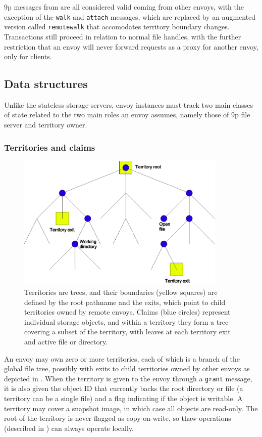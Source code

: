 9p messages from  are all considered valid coming from other envoys, with the exception of the \texttt{walk} and \texttt{attach} messages, which are replaced by an augmented version called \texttt{remotewalk} that accomodates territory boundary changes. Transactions still proceed in relation to normal file handles, with the further restriction that an envoy will never forward requests as a proxy for another envoy, only for clients.

\subsection{Data structures}

Unlike the stateless storage servers, envoy instances must track two main classes of state related to the two main roles an envoy assumes, namely those of 9p file server and territory owner.

\subsubsection{Territories and claims}

\begin{figure}[tp]
\centering
\includegraphics[width=100mm]{figures/territory-claims}
\caption[A territory managed by a single envoy]{Territories are trees, and their boundaries (yellow squares) are defined by the root pathname and the exits, which point to child territories owned by remote envoys. Claims (blue circles) represent individual storage objects, and within a territory they form a tree covering a subset of the territory, with leaves at each territory exit and active file or directory.}
\label{fig:territory-claims}
\end{figure}

An envoy may own zero or more territories, each of which is a branch of the global file tree, possibly with exits to child territories owned by other envoys as depicted in . When the territory is given to the envoy through a \texttt{grant} message, it is also given the object ID that currently backs the root directory or file (a territory can be a single file) and a flag indicating if the object is writable. A territory may cover a snapshot image, in which case all objects are read-only. The root of the territory is never flagged as copy-on-write, so thaw operations (described in ) can always operate locally.

